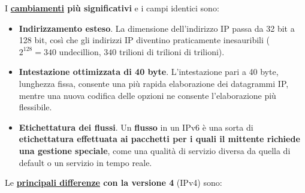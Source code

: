 \documentclass[a4paper]{article}
\begin{document}
	\noindent
	I \textbf{\underline{cambiamenti} più significativi} e i campi identici sono:
	\begin{itemize}[label=]
		\item \textbf{Indirizzamento esteso}. La dimensione dell'indirizzo IP passa da 32 bit a 128 bit, così che gli indirizzi IP diventino praticamente inesauribili ($2^{128} = 340$ undecillion, $340$ trilioni di trilioni di trilioni).
		
		\item \textbf{Intestazione ottimizzata di 40 byte}. L'intestazione pari a 40 byte, lunghezza fissa, consente una più rapida elaborazione dei datagrammi IP, mentre una nuova codifica delle opzioni ne consente l’elaborazione più flessibile.
		
		\item \textbf{Etichettatura dei flussi}. Un \textbf{flusso} in un IPv6 è una sorta di \textbf{etichettatura effettuata ai pacchetti per i quali il mittente richiede una gestione speciale}, come una qualità di servizio diversa da quella di default o un servizio in tempo reale.
	\end{itemize}
	Le \textbf{\underline{principali differenze} con la versione 4} (IPv4) sono:
\end{document}
